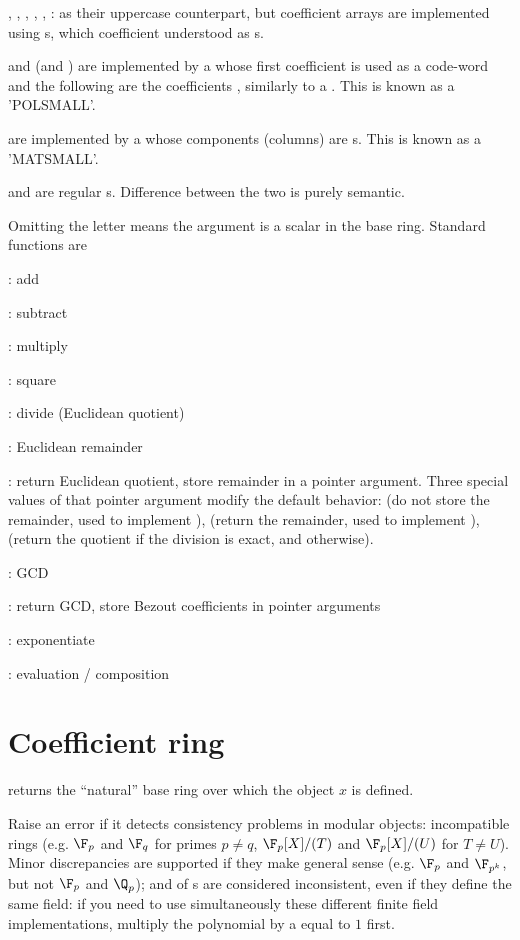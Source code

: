   , , , , , : as their uppercase
  counterpart, but coefficient arrays are implemented using s,
  which coefficient understood as s.

   and  (and ) are implemented by a  whose
  first coefficient is used as a code-word and the following are the
  coefficients , similarly to a . This is known as a 'POLSMALL'.

   are implemented by a  whose components (columns) are
  s. This is known as a 'MATSMALL'.

   and  are regular s. Difference between the
  two is purely semantic.

\noindent Omitting the letter means the argument is a scalar in the base
ring. Standard functions  are

  : add

  : subtract

  : multiply

  : square

  : divide (Euclidean quotient)

  : Euclidean remainder

  : return Euclidean quotient, store remainder in a pointer
argument. Three special values of that pointer argument modify the default
behavior:  (do not store the remainder, used to implement
),  (return the remainder, used to implement
),  (return the quotient if the division is exact,
and  otherwise).

  : GCD

  : return GCD, store Bezout coefficients in pointer arguments

  : exponentiate

  : evaluation / composition

\section{Coefficient ring}

 returns
the ``natural'' base ring over which the object $x$ is defined.

Raise an error if it detects consistency problems in modular objects:
incompatible rings (e.g. $\F_p$ and $\F_q$ for primes $p\neq q$,
$\F_p[X]/(T)$ and $\F_p[X]/(U)$ for $T\neq U$). Minor discrepancies are
supported if they make general sense (e.g. $\F_p$ and $\F_{p^k}$, but not
$\F_p$ and $\Q_p$);  and  of s are
considered inconsistent, even if they define the same field: if you need to
use simultaneously these different finite field implementations, multiply the
polynomial by a  equal to $1$ first.

